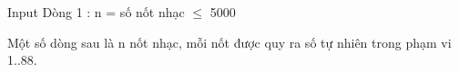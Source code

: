 Input
Dòng 1 : n = số nốt nhạc  $\le$  5000   


   Một số dòng sau là n nốt nhạc, mỗi nốt được quy ra số tự nhiên trong phạm vi 1..88.
